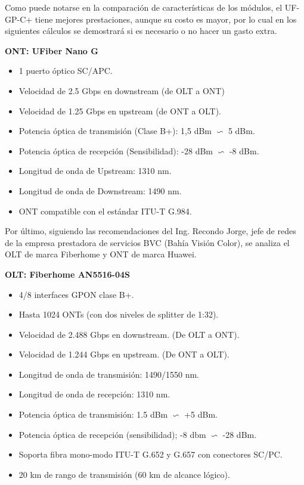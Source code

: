 \documentclass[12pt,a4paper]{book}
\begin{document}
Como puede notarse en la comparación de características de los módulos,
el UF-GP-C+ tiene mejores prestaciones, aunque su costo es mayor, por lo
cual en los siguientes cálculos se demostrará si es necesario o no hacer un
gasto extra.\bigskip

\textbf{ONT: UFiber Nano G} \medskip
\begin{itemize}
	\item 1 puerto óptico SC/APC.
	\item Velocidad de 2.5 Gbps en downstream (de OLT a ONT)
	\item Velocidad de 1.25 Gbps en upstream (de ONT a OLT).
	\item Potencia óptica de transmisión (Clase B+): 1,5 dBm $\backsim$ 5 dBm.
	\item Potencia óptica de recepción (Sensibilidad): -28 dBm $\backsim$ -8
dBm.
	\item Longitud de onda de Upstream: 1310 nm.
	\item Longitud de onda de Downstream: 1490 nm.
	\item ONT compatible con el estándar ITU-T G.984.
\end{itemize} \bigskip

Por último, siguiendo las recomendaciones del Ing. Recondo Jorge, jefe de redes de la empresa prestadora de servicios BVC (Bahía Visión Color), se analiza el OLT de marca Fiberhome y ONT de marca Huawei.\bigskip

\textbf{OLT: Fiberhome AN5516-04S}\medskip
\begin{itemize}
\item 4/8 interfaces GPON clase B+.
\item Hasta 1024 ONTs (con dos niveles de splitter de 1:32).
\item Velocidad de 2.488 Gbps en downstream. (De OLT a ONT).
\item Velocidad de 1.244 Gbps en upstream. (De ONT a OLT).
\item Longitud de onda de transmisión: 1490/1550 nm.
\item Longitud de onda de recepción: 1310 nm.
\item Potencia óptica de transmisión: 1.5 dBm $\backsim$ +5 dBm.
\item Potencia óptica de recepción (sensibilidad); -8 dbm $\backsim$ -28 dBm.
\item Soporta fibra mono-modo ITU-T G.652 y G.657 con conectores SC/PC.
\item 20 km de rango de transmisión (60 km de alcance lógico).
\end{itemize}\bigskip
\end{document}
